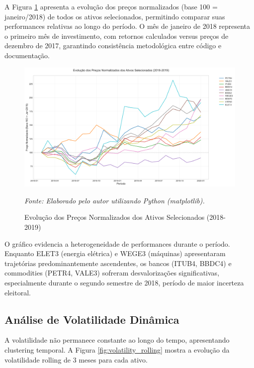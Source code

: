 A Figura \ref{fig:price_evolution} apresenta a evolução dos preços normalizados (base 100 = janeiro/2018) de todos os ativos selecionados, permitindo comparar suas performances relativas ao longo do período. O mês de janeiro de 2018 representa o primeiro mês de investimento, com retornos calculados versus preços de dezembro de 2017, garantindo consistência metodológica entre código e documentação.

\begin{figure}[H]
\centering
\includegraphics[width=\textwidth]{images/price_evolution.png}
\caption{Evolução dos Preços Normalizados dos Ativos Selecionados (2018-2019)}
\textit{Fonte: Elaborado pelo autor utilizando Python (matplotlib).}
\label{fig:price_evolution}
\end{figure}

O gráfico evidencia a heterogeneidade de performances durante o período. Enquanto ELET3 (energia elétrica) e WEGE3 (máquinas) apresentaram trajetórias predominantemente ascendentes, os bancos (ITUB4, BBDC4) e commodities (PETR4, VALE3) sofreram desvalorizações significativas, especialmente durante o segundo semestre de 2018, período de maior incerteza eleitoral.

\subsection{Análise de Volatilidade Dinâmica}

A volatilidade não permanece constante ao longo do tempo, apresentando clustering temporal. A Figura \ref{fig:volatility_rolling} mostra a evolução da volatilidade rolling de 3 meses para cada ativo.


